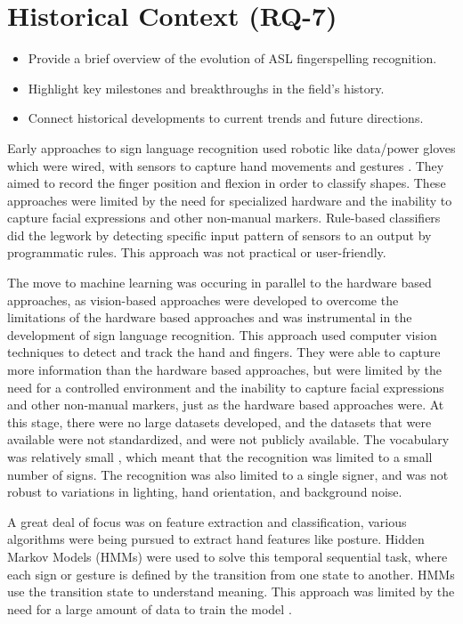 \section{Historical Context (RQ-7)}

\begin{itemize}
    \item Provide a brief overview of the evolution of ASL fingerspelling recognition.
    \item Highlight key milestones and breakthroughs in the field's history.
    \item Connect historical developments to current trends and future directions.
\end{itemize}
Early approaches to sign language recognition used robotic like data/power gloves which were wired, with sensors to capture hand movements and gestures \cite{saeedSystematicReviewSystemsBased2022}. They aimed to record the finger position and flexion in order to classify shapes. These approaches were limited by the need for specialized hardware and the inability to capture facial expressions and other non-manual markers. Rule-based classifiers did the legwork by detecting specific input pattern of sensors to an output by programmatic rules. This approach was not practical or user-friendly.

The move to machine learning was occuring in parallel to the hardware based approaches, as
vision-based approaches were developed to overcome the limitations of the hardware based approaches and was instrumental in the development of sign language recognition. This approach used computer vision techniques to detect and track the hand and fingers. They were able to capture more information than the hardware based approaches, but were limited by the need for a controlled environment and the inability to capture facial expressions and other non-manual markers, just as the hardware based approaches were. At this stage, there were no large datasets developed, and the datasets that were available were not standardized, and were not publicly available. The vocabulary was relatively small \cite{vonagrisRecentDevelopmentsVisual2008}, which meant that the recognition was limited to a small number of signs. The recognition was also limited to a single signer, and was not robust to variations in lighting, hand orientation, and background noise.

A great deal of focus was on feature extraction and classification, various algorithms were being pursued to extract hand features like posture. Hidden Markov Models (HMMs) were used to solve this temporal sequential task, where each sign or gesture is defined by the transition from one state to another. HMMs use the transition state to understand meaning. This approach was limited by the need for a large amount of data to train the model \cite{vonagrisRecentDevelopmentsVisual2008}.

